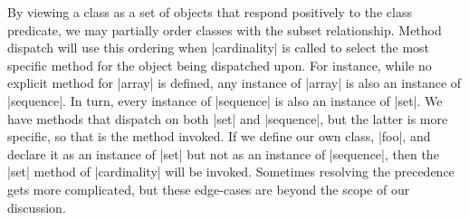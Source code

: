 By viewing a class as a set of objects that respond positively to the class
predicate, we may partially order classes with the subset relationship.  Method
dispatch will use this ordering when \factor|cardinality| is called to select
the most specific method for the object being dispatched upon.  For instance,
while no explicit method for \factor|array| is defined, any instance of
\factor|array| is also an instance of \factor|sequence|.  In turn, every
instance of \factor|sequence| is also an instance of \factor|set|.  We have
methods that dispatch on both \factor|set| and \factor|sequence|, but the
latter is more specific, so that is the method invoked.  If we define our own
class, \factor|foo|, and declare it as an instance of \factor|set| but not as
an instance of \factor|sequence|, then the \factor|set| method of
\factor|cardinality| will be invoked.  Sometimes resolving the precedence gets
more complicated, but these edge-cases are beyond the scope of our discussion.


